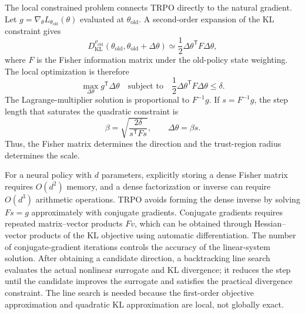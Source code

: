 The local constrained problem connects TRPO directly to the natural gradient.
Let $g=\nabla_\theta L_{\theta_{\mathrm{old}}}(\theta)$ evaluated at
$\theta_{\mathrm{old}}$. A second-order expansion of the KL constraint gives
\begin{equation}
    D_{\mathrm{KL}}^{\rho_{\mathrm{old}}}
    (\theta_{\mathrm{old}},\theta_{\mathrm{old}}+\Delta\theta)
    \simeq\frac{1}{2}\Delta\theta^{\mathsf T}F\Delta\theta,
    \label{eq:rl-trpo-fisher-quadratic}
\end{equation}
where $F$ is the Fisher information matrix under the old-policy state
weighting. The local optimization is therefore
\begin{equation}
    \max_{\Delta\theta}g^{\mathsf T}\Delta\theta
    \quad\text{subject to}\quad
    \frac{1}{2}\Delta\theta^{\mathsf T}F\Delta\theta\leq\delta.
    \label{eq:rl-trpo-local-problem}
\end{equation}
The Lagrange-multiplier solution is proportional to $F^{-1}g$. If
$s=F^{-1}g$, the step length that saturates the quadratic constraint is
\begin{equation}
    \beta=\sqrt{\frac{2\delta}{s^{\mathsf T}Fs}},
    \qquad
    \Delta\theta=\beta s.
    \label{eq:rl-trpo-step-length}
\end{equation}
Thus, the Fisher matrix determines the direction and the trust-region radius
determines the scale.

For a neural policy with $d$ parameters, explicitly storing a dense Fisher
matrix requires $O(d^2)$ memory, and a dense factorization or inverse can
require $O(d^3)$ arithmetic operations. TRPO avoids forming the dense inverse
by solving $Fs=g$ approximately with conjugate gradients. Conjugate gradients
requires repeated matrix--vector products $Fv$, which can be obtained through
Hessian--vector products of the KL objective using automatic differentiation.
The number of conjugate-gradient iterations controls the accuracy of the
linear-system solution. After obtaining a candidate direction, a backtracking
line search evaluates the actual nonlinear surrogate and KL divergence; it
reduces the step until the candidate improves the surrogate and satisfies the
practical divergence constraint. The line search is needed because the
first-order objective approximation and quadratic KL approximation are local,
not globally exact.

